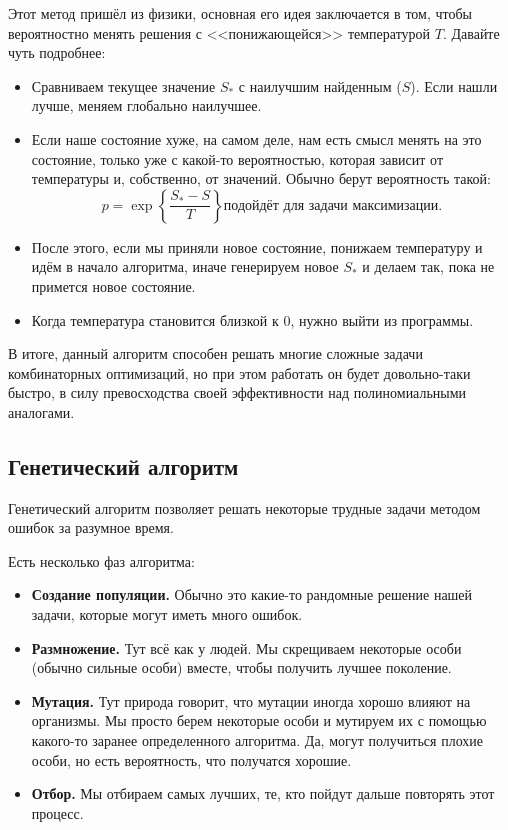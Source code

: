 Этот метод пришёл из физики, основная его идея заключается
в том, чтобы вероятностно менять решения с <<понижающейся>>
температурой $T$. Давайте чуть подробнее:

\begin{itemize}
  \item Сравниваем текущее значение $S_*$ с наилучшим найденным ($S$).
  Если нашли лучше, меняем глобально наилучшее.
  \item Если наше состояние хуже, на самом деле, нам есть
  смысл менять на это состояние, только уже с какой-то
  вероятностью, которая зависит от температуры и, собственно,
  от значений. Обычно берут вероятность такой:
  \[
    p = \exp\left\{\frac{S_* - S}{T}\right\} \text{подойдёт для задачи максимизации.}
  \]
  \item После этого, если мы приняли новое состояние,
  понижаем температуру и идём в начало алгоритма, иначе генерируем
  новое $S_*$ и делаем так, пока не примется новое состояние.
  \item Когда температура становится близкой к 0, нужно выйти
  из программы.
\end{itemize}

В итоге, данный алгоритм способен решать многие сложные задачи комбинаторных
оптимизаций, но при этом работать он будет довольно-таки быстро,
в силу превосходства своей эффективности над полиномиальными аналогами.

\subsection{Генетический алгоритм}

Генетический алгоритм позволяет решать некоторые трудные задачи методом ошибок
за разумное время.

Есть несколько фаз алгоритма:

\begin{itemize}
  \item {\bf Создание популяции.} Обычно это какие-то рандомные решение нашей 
  задачи, которые могут иметь много ошибок.
  \item {\bf Размножение.} Тут всё как у людей. Мы скрещиваем некоторые особи 
  (обычно сильные особи) вместе, чтобы получить лучшее поколение.
  \item {\bf Мутация.} Тут природа говорит, что мутации иногда хорошо влияют
  на организмы. Мы просто берем некоторые особи и мутируем их с помощью
  какого-то заранее определенного алгоритма. Да, могут получиться плохие
  особи, но есть вероятность, что получатся хорошие.
  \item {\bf Отбор.} Мы отбираем самых лучших, те, кто пойдут дальше повторять
  этот процесс.
\end{itemize}

